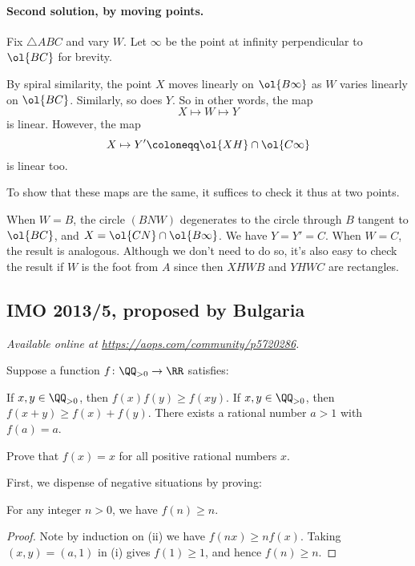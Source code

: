 \documentclass[11pt]{scrartcl}
\begin{document}
\paragraph{Second solution, by moving points.}
Fix $\triangle ABC$ and vary $W$.
Let $\infty$ be the point at infinity perpendicular to $\ol{BC}$
for brevity.

By spiral similarity, the point $X$ moves linearly on $\ol{B\infty}$
as $W$ varies linearly on $\ol{BC}$.
Similarly, so does $Y$.
So in other words, the map \[ X \mapsto W \mapsto Y \]
is linear.
However, the map \[ X \mapsto Y' \coloneqq \ol{XH} \cap \ol{C\infty} \]
is linear too.

To show that these maps are the same,
it suffices to check it thus at two points.
\begin{itemize}
  \ii When $W = B$, the circle $(BNW)$
  degenerates to the circle through $B$ tangent to $\ol{BC}$,
  and $X = \ol{CN} \cap \ol{B\infty}$.
  We have $Y = Y' = C$.
  \ii When $W = C$, the result is analogous.
  \ii Although we don't need to do so,
  it's also easy to check the result if $W$
  is the foot from $A$
  since then $XHWB$ and $YHWC$ are rectangles.
\end{itemize}
\pagebreak

\subsection{IMO 2013/5, proposed by Bulgaria}
\textsl{Available online at \url{https://aops.com/community/p5720286}.}
\begin{mdframed}[style=mdpurplebox,frametitle={Problem statement}]
Suppose a function $f \colon \QQ_{>0} \to \RR$ satisfies:
\begin{enumerate}
  \ii [(i)] If $x,y \in \QQ_{>0}$, then $f(x)f(y) \ge f(xy)$.
  \ii [(ii)] If $x,y \in \QQ_{>0}$, then $f(x+y) \ge f(x) + f(y)$.
  \ii [(iii)] There exists a rational number $a > 1$ with $f(a) = a$.
\end{enumerate}
Prove that $f(x) = x$ for all positive rational numbers $x$.
\end{mdframed}
First, we dispense of negative situations by proving:
\begin{claim*}
  For any integer $n > 0$, we have $f(n) \ge n$.
\end{claim*}
\begin{proof}
  Note by induction on (ii) we have $f(nx) \ge n f(x)$.
  Taking $(x,y) = (a,1)$ in (i) gives $f(1) \ge 1$,
  and hence $f(n) \ge n$.
\end{proof}
\end{document}
